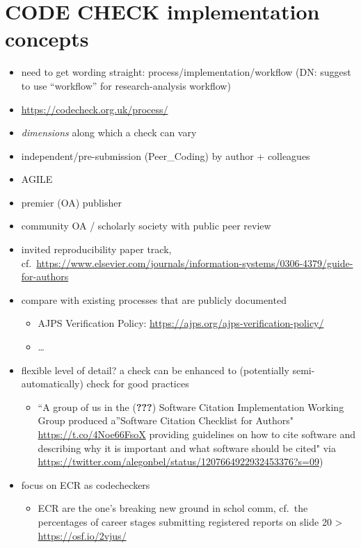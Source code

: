 \documentclass[12pt]{article}
\begin{document}
\section*{CODE CHECK implementation concepts}\label{code-check-implementation-concepts}

\begin{itemize}
\item
  need to get wording straight: process/implementation/workflow (DN:
  suggest to use ``workflow'' for research-analysis workflow)
\item
  \url{https://codecheck.org.uk/process/}
\item
  \emph{dimensions} along which a check can vary
\item
  independent/pre-submission (Peer\_Coding) by author + colleagues
\item
  AGILE
\item
  premier (OA) publisher
\item
  community OA / scholarly society with public peer review
\item
  invited reproducibility paper track,
  cf.~\url{https://www.elsevier.com/journals/information-systems/0306-4379/guide-for-authors}
\item
  compare with existing processes that are publicly documented

  \begin{itemize}
  \item
    AJPS Verification Policy:
    \url{https://ajps.org/ajps-verification-policy/}
  \item
    \ldots{}
  \end{itemize}
\item
  flexible level of detail? a check can be enhanced to (potentially
  semi-automatically) check for good practices

  \begin{itemize}
  \item
    ``A group of us in the ({\textbf{???}}) Software Citation
    Implementation Working Group produced a''Software Citation Checklist
    for Authors" \url{https://t.co/4Noe66FsoX} providing guidelines on
    how to cite software and describing why it is important and what
    software should be cited" via
    \url{https://twitter.com/alegonbel/status/1207664922932453376?s=09})
  \end{itemize}
\item
  focus on ECR as codecheckers

  \begin{itemize}
  \item
    ECR are the one's breaking new ground in schol comm, cf.~the
    percentages of career stages submitting registered reports on slide
    20 \textgreater{} \url{https://osf.io/2vjus/}
  \end{itemize}
\end{itemize}
\end{document}
